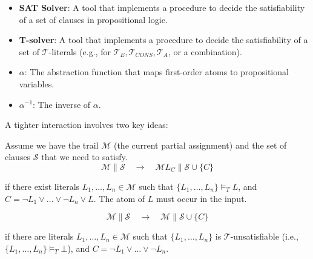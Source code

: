 \documentclass[11pt,a4paper]{article}
\theoremstyle{definition}
\theoremstyle{plain}
\theoremstyle{remark}
\begin{document}
\begin{itemize}

    \item \textbf{SAT Solver}: A tool that implements a procedure to decide the satisfiability of a set of clauses in propositional logic.

    \item \textbf{T-solver}: A tool that implements a procedure to decide the satisfiability of a set of $\mathcal{T}$-literals (e.g., for $\mathcal{T}_E, \mathcal{T}_{CONS}, \mathcal{T}_A$, or a combination).

    \item \textbf{$\alpha$}: The abstraction function that maps first-order atoms to propositional variables.

    \item \textbf{$\alpha^{-1}$}: The inverse of $\alpha$.

\end{itemize}



A tighter interaction involves two key ideas:



\begin{tcolorbox}[colback=blue!5!white,colframe=blue!75!black,title=\textbf{Theory Propagation}]

Assume we have the trail $\mathcal{M}$ (the current partial assignment) and the set of clauses $\mathcal{S}$ that we need to satisfy.
\[
\mathcal{M} \parallel \mathcal{S} \quad \longrightarrow \quad \mathcal{M}L_C \parallel \mathcal{S} \cup \{C\}
\]

if there exist literals $L_1, \dots, L_n \in \mathcal{M}$ such that $\{L_1, \dots, L_n\} \models_T L$, and $C = \neg L_1 \vee \dots \vee \neg L_n \vee L$. The atom of $L$ must occur in the input.

\end{tcolorbox}



\begin{tcolorbox}[colback=red!5!white,colframe=red!75!black,title=\textbf{Theory Conflict}]
\[
\mathcal{M} \parallel \mathcal{S} \quad \longrightarrow \quad \mathcal{M} \parallel \mathcal{S} \cup \{C\}
\]

if there are literals $L_1, \dots, L_n \in \mathcal{M}$ such that $\{L_1, \dots, L_n\}$ is $\mathcal{T}$-unsatisfiable (i.e., $\{L_1, \dots, L_n\} \models_T \bot$), and $C = \neg L_1 \vee \dots \vee \neg L_n$.

\end{tcolorbox}
\end{document}
